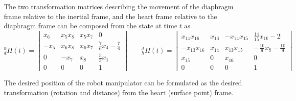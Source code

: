 The two transformation matrices describing the movement of the diaphragm frame relative to the inertial frame, and the heart frame relative to the diaphragm frame can be composed from the state at time $t$ as \citep{bib:heart_model}
\begin{equation}
^0_dH(t) = 
\begin{bmatrix}
x_6 & x_5 x_8 & x_5 x_7 & 0\\
-x_5 & x_6 x_8 & x_6 x_7 & \tfrac{7}{6} x_4 - \tfrac{7}{6} \\
0 & -x_7 & x_8 & \tfrac{5}{3}x_1\\
0 & 0 & 0 & 1
\end{bmatrix}
\quad\quad
^d_hH(t) = 
\begin{bmatrix}
x_{14} x_{16} & x_{13} & -x_{14} x_{15} & \tfrac{14}{15} x_{10}-2\\
-x_{13}  x_{16} & x_{14} & x_{13} x_{15} & -\tfrac{10}{9} x_9 - \tfrac{10}{9}\\
x_{15} & 0 & x_{16} & 0\\
0 & 0 & 0 & 1
\end{bmatrix}
\end{equation}

The desired position of the robot manipulator can be formulated as the desired transformation (rotation and distance) from the heart (surface point) frame.


